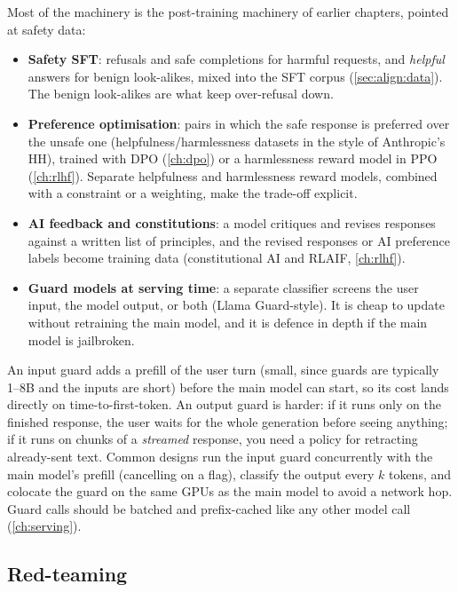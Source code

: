 Most of the machinery is the post-training machinery of earlier chapters, pointed at safety data:
\begin{itemize}
  \item \textbf{Safety SFT}: refusals and safe completions for harmful requests, and
        \emph{helpful} answers for benign look-alikes, mixed into the SFT corpus
        (\cref{sec:align:data}). The benign look-alikes are what keep over-refusal down.
  \item \textbf{Preference optimisation}: pairs in which the safe response is preferred over the unsafe one
        (helpfulness/harmlessness datasets in the style of Anthropic's HH), trained with DPO
        (\cref{ch:dpo}) or a harmlessness reward model in PPO (\cref{ch:rlhf}). Separate
        helpfulness and harmlessness reward models, combined with a constraint or a weighting,
        make the trade-off explicit.
  \item \textbf{AI feedback and constitutions}: a model critiques and revises responses against a
        written list of principles, and the revised responses or AI preference labels become
        training data (constitutional AI and RLAIF, \cref{ch:rlhf}).
  \item \textbf{Guard models at serving time}: a separate classifier screens the user input, the
        model output, or both (Llama Guard-style). It is cheap to update without retraining the
        main model, and it is defence in depth if the main model is jailbroken.
\end{itemize}

\begin{systemslens}
An input guard adds a prefill of the user turn (small, since guards are typically 1--8B and the
inputs are short) before the main model can start, so its cost lands directly on
time-to-first-token. An output guard is harder: if it runs only on the finished response, the
user waits for the whole generation before seeing anything; if it runs on chunks of a
\emph{streamed} response, you need a policy for retracting already-sent text. Common designs run
the input guard concurrently with the main model's prefill (cancelling on a flag), classify the
output every $k$ tokens, and colocate the guard on the same GPUs as the main model to avoid a
network hop. Guard calls should be batched and prefix-cached like any other model call
(\cref{ch:serving}).
\end{systemslens}

\subsection{Red-teaming}

